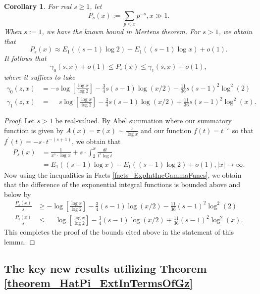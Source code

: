 \documentclass[11pt,reqno,a4letter]{article}
\numberwithin{figure}{section}
\numberwithin{table}{section}
\theoremstyle{plain}
\newtheorem{cor}[theorem]{Corollary}
\numberwithin{theorem}{section}
\theoremstyle{definition}
\begin{document}
\begin{cor} 
\label{cor_PartialSumsOfReciprocalsOfPrimePowers} 
For real $s \geq 1$, let 
\[
P_s(x) := \sum_{p \leq x} p^{-s}, x \gg 1. 
\]
When $s := 1$, we have the known bound in Mertens theorem. For $s > 1$, we obtain that 
\[
P_s(x) \approx E_1((s-1) \log 2) - E_1((s-1) \log x) + o(1). 
\]
It follows that 
\[
\gamma_0(s, x) + o(1) \leq P_s(x) \leq \gamma_1(s, x) + o(1), 
\]
where it suffices to take 
\begin{align*}
\gamma_0(z, x) & = -s\log\left[\frac{\log x}{\log 2}\right] - \frac{3}{4}s(s-1) \log(x/2) - 
     \frac{11}{36} s(s-1)^2 \log^2(2) \\ 
\gamma_1(z, x) & = \phantom{-} s\log\left[\frac{\log x}{\log 2}\right] - \frac{3}{4}s(s-1) \log(x/2) + 
     \frac{11}{36} s(s-1)^2 \log^2(x). 
\end{align*}
\end{cor} 
\begin{proof} 
Let $s > 1$ be real-valued. 
By Abel summation where our summatory function is given by $A(x) = \pi(x) \sim \frac{x}{\log x}$ and 
our function $f(t) = t^{-s}$ so that $f^{\prime}(t) = -s \cdot t^{-(s+1)}$, we obtain that 
\begin{align*} 
P_s(x) & = \frac{1}{x^s \cdot \log x} + s \cdot \int_2^{x} \frac{dt}{t^s \log t} \\ 
     & = E_1((s-1) \log x) - E_1((s-1) \log 2) + o(1), |x| \rightarrow \infty. 
\end{align*} 
Now using the inequalities in Facts \ref{facts_ExpIntIncGammaFuncs}, we obtain that the 
difference of the exponential integral functions is bounded above and below by 
\begin{align*} 
\frac{P_s(x)}{s} & \geq -\log\left[\frac{\log x}{\log 2}\right] - \frac{3}{4}(s-1) \log(x/2) - 
     \frac{11}{36} (s-1)^2 \log^2(2) \\ 
\frac{P_s(x)}{s} & \leq \phantom{-} \log\left[\frac{\log x}{\log 2}\right] - \frac{3}{4}(s-1) \log(x/2) + 
     \frac{11}{36} (s-1)^2 \log^2(x). 
\end{align*} 
This completes the proof of the bounds cited above in the statement of this lemma. 
\end{proof} 

\subsection{The key new results utilizing Theorem \ref{theorem_HatPi_ExtInTermsOfGz}} 
\end{document}
